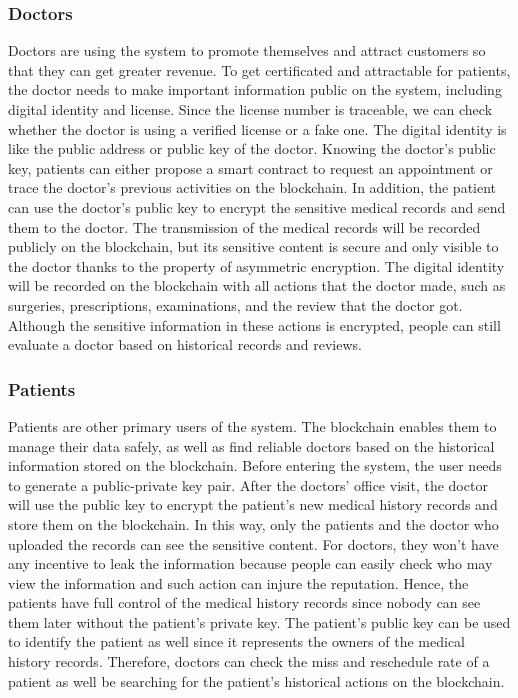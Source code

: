 \documentclass{article}
\begin{document}
\subsubsection{Doctors}
Doctors are using the system to promote themselves and attract customers so that they can get greater revenue. To get certificated and attractable for patients, the doctor needs to make important information public on the system, including digital identity and license. Since the license number is traceable, we can check whether the doctor is using a verified license or a fake one. The digital identity is like the public address or public key of the doctor. Knowing the doctor's public key, patients can either propose a smart contract to request an appointment or trace the doctor's previous activities on the blockchain. In addition, the patient can use the doctor's public key to encrypt the sensitive medical records and send them to the doctor. The transmission of the medical records will be recorded publicly on the blockchain, but its sensitive content is secure and only visible to the doctor thanks to the property of asymmetric encryption\cite{encryption}. The digital identity will be recorded on the blockchain with all actions that the doctor made, such as surgeries, prescriptions, examinations, and the review that the doctor got. Although the sensitive information in these actions is encrypted, people can still evaluate a doctor based on historical records and reviews.
\subsubsection{Patients}
Patients are other primary users of the system. The blockchain enables them to manage their data safely, as well as find reliable doctors based on the historical information stored on the blockchain. Before entering the system, the user needs to generate a public-private key pair. After the doctors' office visit, the doctor will use the public key to encrypt the patient's new medical history records and store them on the blockchain. In this way, only the patients and the doctor who uploaded the records can see the sensitive content. For doctors, they won't have any incentive to leak the information because people can easily check who may view the information and such action can injure the reputation. Hence, the patients have full control of the medical history records since nobody can see them later without the patient's private key. The patient's public key can be used to identify the patient as well since it represents the owners of the medical history records. Therefore, doctors can check the miss and reschedule rate of a patient as well be searching for the patient's historical actions on the blockchain.
\end{document}
